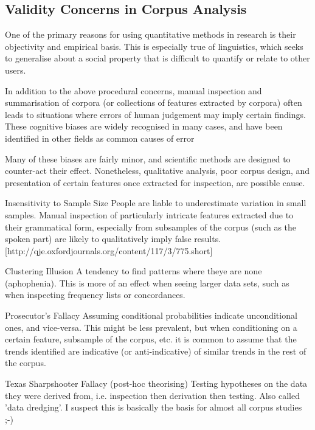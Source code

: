 \subsection{Validity Concerns in Corpus Analysis}
One of the primary reasons for using quantitative methods in research is their objectivity and empirical basis.  This is especially true of linguistics, which seeks to generalise about a social property that is difficult to quantify or relate to other users.

In addition to the above procedural concerns, manual inspection and summarisation of corpora (or collections of features extracted by corpora) often leads to situations where errors of human judgement may imply certain findings.  These cognitive biases are widely recognised in many cases, and have been identified in other fields as common causes of error 

Many of these biases are fairly minor, and scientific methods are designed to counter-act their effect.  Nonetheless, qualitative analysis, poor corpus design, and presentation of certain features once extracted for inspection, are possible cause.  


\begin{itemizeTitle}
    \item[Insensitivity to Sample Size] People are liable to underestimate variation in small samples.  Manual inspection of particularly intricate features extracted due to their grammatical form, especially from subsamples of the corpus (such as the spoken part) are likely to qualitatively imply false results. [http://qje.oxfordjournals.org/content/117/3/775.short]
    \item[Clustering Illusion] A tendency to find patterns where theye are none (aphophenia).  This is more of an effect when seeing larger data sets, such as when inspecting frequency lists or concordances.
    \item[Prosecutor's Fallacy] Assuming conditional probabilities indicate unconditional ones, and vice-versa.  This might be less prevalent, but when conditioning on a certain feature, subsample of the corpus, etc. it is common to assume that the trends identified are indicative (or anti-indicative) of similar trends in the rest of the corpus.
    \item[Texas Sharpshooter Fallacy (post-hoc theorising)] Testing hypotheses on the data they were derived from, i.e. inspection then derivation then testing.  Also called 'data dredging'.  I suspect this is basically the basis for almost all corpus studies ;-)
\end{itemizeTitle}



